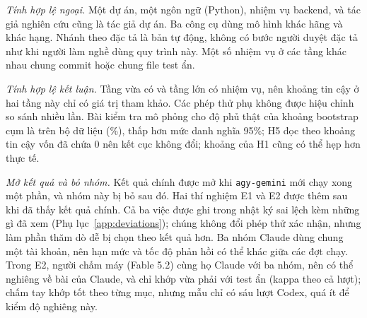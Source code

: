 \textit{Tính hợp lệ ngoại.} Một dự án, một ngôn ngữ (Python), \NumTasksMain{} nhiệm vụ backend, và tác
giả nghiên cứu cũng là tác giả dự án. Ba công cụ dùng mô hình khác hãng và khác hạng. Nhánh theo đặc tả
là bản tự động, không có bước người duyệt đặc tả như khi người làm nghề dùng quy trình này. Một số nhiệm
vụ ở các tầng khác nhau chung commit hoặc chung file test ẩn.

\textit{Tính hợp lệ kết luận.} Tầng vừa có \NumMediumTasks{} và tầng lớn có \NumFeatureTasks{} nhiệm vụ,
nên khoảng tin cậy ở hai tầng này chỉ có giá trị tham khảo. Các phép thử phụ không được hiệu chỉnh so sánh
nhiều lần. Bài kiểm tra mô phỏng cho độ phủ thật của khoảng bootstrap cụm là \NumResCoverageHits{} trên
\NumResCoverageSets{} bộ dữ liệu (\NumResCoveragePct{}\%), thấp hơn mức danh nghĩa 95\%; H5 đọc theo khoảng
tin cậy vốn đã chứa 0 nên kết cục không đổi; khoảng của H1 cũng có thể hẹp hơn thực tế.

\textit{Mở kết quả và bỏ nhóm.} Kết quả chính được mở khi \texttt{agy-gemini} mới chạy xong một phần, và
nhóm này bị bỏ sau đó. Hai thí nghiệm E1 và E2 được thêm sau khi đã thấy kết quả chính. Cả ba việc được ghi
trong nhật ký sai lệch kèm những gì đã xem (Phụ lục~\ref{app:deviations}); chúng không đổi phép thử xác
nhận, nhưng làm phần thăm dò dễ bị chọn theo kết quả hơn. Ba nhóm Claude dùng chung một tài khoản, nên
hạn mức và tốc độ phản hồi có thể khác giữa các đợt chạy. Trong E2, người chấm máy (Fable 5.2) cùng họ
Claude với ba nhóm, nên có thể nghiêng về bài của Claude, và chỉ khớp vừa phải với test ẩn
(kappa \NumETwoJudgeKappa{} theo cả lượt); chấm tay khớp tốt theo từng mục, nhưng mẫu chỉ có sáu lượt
Codex, quá ít để kiểm độ nghiêng này.
